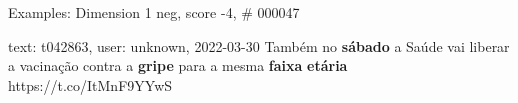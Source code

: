 \begin{frame}{Examples: Dimension 1 neg, score -4, \# 000047}
\footnotesize
\begin{alertblock}{text: t042863, user: unknown, 2022-03-30}
Também no \textbf{sábado} a Saúde vai liberar a vacinação contra a 
\textbf{gripe} para a mesma \textbf{faixa} \textbf{etária} 
https://t.co/ItMnF9YYwS 
\end{alertblock}
\end{frame}
